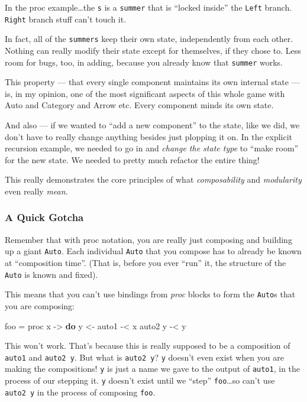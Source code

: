 \documentclass[]{article}
\newenvironment{Shaded}{}{}
\newcommand{\KeywordTok}[1]{\textcolor[rgb]{0.00,0.44,0.13}{\textbf{{#1}}}}
\newcommand{\OtherTok}[1]{\textcolor[rgb]{0.00,0.44,0.13}{{#1}}}
\newcommand{\FunctionTok}[1]{\textcolor[rgb]{0.02,0.16,0.49}{{#1}}}
\newcommand{\NormalTok}[1]{{#1}}
\begin{document}
In the proc example\ldots{}the \texttt{s} is a \texttt{summer} that is
``locked inside'' the \texttt{Left} branch. \texttt{Right} branch stuff
can't touch it.

In fact, all of the \texttt{summers} keep their own state, independently
from each other. Nothing can really modify their state except for
themselves, if they chose to. Less room for bugs, too, in adding,
because you already know that \texttt{summer} works.

This property --- that every single component maintains its own internal
state --- is, in my opinion, one of the most significant aspects of this
whole game with Auto and Category and Arrow etc. Every component minds
its own state.

And also --- if we wanted to ``add a new component'' to the state, like
we did, we don't have to really change anything besides just plopping it
on. In the explicit recursion example, we needed to go in and
\emph{change the state type} to ``make room'' for the new state. We
needed to pretty much refactor the entire thing!

This really demonstrates the core principles of what
\emph{composability} and \emph{modularity} even really \emph{mean}.

\subsubsection{A Quick Gotcha}\label{a-quick-gotcha}

Remember that with proc notation, you are really just composing and
building up a giant \texttt{Auto}. Each individual \texttt{Auto} that
you compose has to already be known at ``composition time''. (That is,
before you ever ``run'' it, the structure of the \texttt{Auto} is known
and fixed).

This means that you can't use bindings from \emph{proc} blocks to form
the \texttt{Auto}s that you are composing:

\begin{Shaded}
\begin{Highlighting}[]
\NormalTok{foo }\FunctionTok{=} \NormalTok{proc x }\OtherTok{->} \KeywordTok{do}
    \NormalTok{y }\OtherTok{<-} \NormalTok{auto1 }\FunctionTok{-<} \NormalTok{x}
    \NormalTok{auto2 y }\FunctionTok{-<} \NormalTok{y}
\end{Highlighting}
\end{Shaded}

This won't work. That's because this is really supposed to be a
composition of \texttt{auto1} and \texttt{auto2\ y}. But what is
\texttt{auto2\ y}? \texttt{y} doesn't even exist when you are making the
compositions! \texttt{y} is just a name we gave to the output of
\texttt{auto1}, in the process of our stepping it. \texttt{y} doesn't
exist until we ``step'' \texttt{foo}\ldots{}so can't use
\texttt{auto2\ y} in the process of composing \texttt{foo}.
\end{document}

